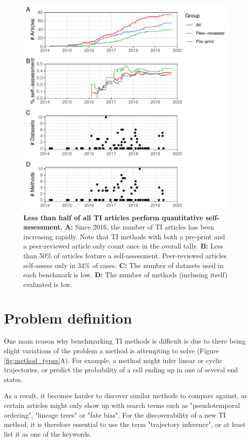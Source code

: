 \begin{figure}[htb!]
	\centering
	\includegraphics[width=.75\linewidth]{fig/self_assessment.pdf} 
	\caption{
		\textbf{Less than half of all TI articles perform quantitative self-assessment.} 
		\textbf{A:} Since 2016, the number of TI articles has been increasing rapidly. Note that TI methods with both a pre-print and a peer-reviewed article only count once in the overall tally.
		\textbf{B:} Less than 50\% of articles feature a self-assessment. Peer-reviewed articles self-assess only in 34\% of cases.
		\textbf{C:} The number of datasets used in each benchmark is low.
		\textbf{D:} The number of methods (inclusing itself) evaluated is low.
	}
	\label{fig:benchmarks_over_time}
\end{figure}

\section{Problem definition}
One main reason why benchmarking TI methods is difficult is due to there being slight variations 
of the problem a method is attempting to solve (Figure \ref{fig:method_types}A). For example, a method might infer linear or cyclic trajectories, or predict the probability of a cell ending up in one of several end states.

As a result, it becomes harder to discover similar methods to compare against, as certain articles might only show up with search terms such as "pseudotemporal ordering", "lineage trees" or "fate bias". For the discoverability of a new TI method, it is therefore essential to use the term "trajectory inference", or at least list it as one of the keywords. 

